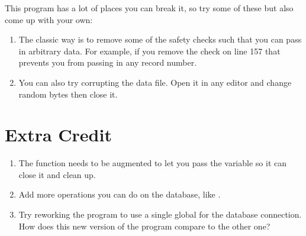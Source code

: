This program has a lot of places you can break it, so try some of these
but also come up with your own:

\begin{enumerate}
\item The classic way is to remove some of the safety checks such that you can
    pass in arbitrary data. For example, if you remove the check on line 157
    that prevents you from passing in any record number.
\item You can also try corrupting the data file.  Open it in any editor and
    change random bytes then close it.
\end{enumerate}

\section{Extra Credit}

\begin{enumerate}
\item The  function needs to be augmented to let you pass the 
    variable so it can close it and clean up.
\item Add more operations you can do on the database, like .
\item Try reworking the program to use a single global for the database connection.
    How does this new version of the program compare to the other one?
\end{enumerate}
